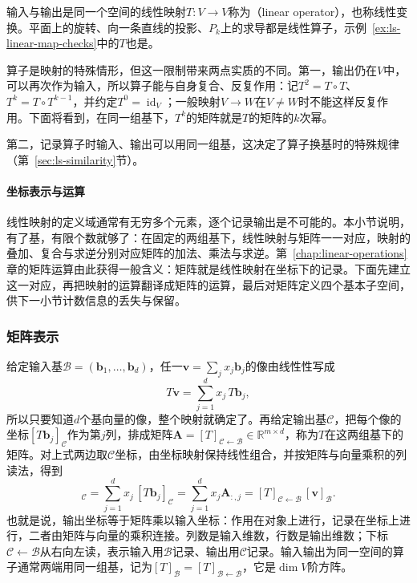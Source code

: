 \label{sec:ls-operator-powers}
输入与输出是同一个空间的线性映射$T:V\to V$称为（linear operator），也称线性变换。平面上的旋转、向一条直线的投影、$P_k$上的求导都是线性算子，示例~\ref{ex:ls-linear-map-checks}中的$T$也是。

算子是映射的特殊情形，但这一限制带来两点实质的不同。第一，输出仍在$V$中，可以再次作为输入，所以算子能与自身复合、反复作用：记$T^2=T\circ T$、$T^k=T\circ T^{k-1}$，并约定$T^0=\operatorname{id}_V$；一般映射$V\to W$在$V\neq W$时不能这样反复作用。下面将看到，在同一组基下，$T^k$的矩阵就是$T$的矩阵的$k$次幂。

第二，记录算子时输入、输出可以用同一组基，这决定了算子换基时的特殊规律（第~\ref{sec:ls-similarity}节）。

\paragraph{坐标表示与运算}
\label{sec:ls-map-representation}

线性映射的定义域通常有无穷多个元素，逐个记录输出是不可能的。本小节说明，有了基，有限个数就够了：在固定的两组基下，线性映射与矩阵一一对应，映射的叠加、复合与求逆分别对应矩阵的加法、乘法与求逆。第~\ref{chap:linear-operations}章的矩阵运算由此获得一般含义：矩阵就是线性映射在坐标下的记录。下面先建立这一对应，再把映射的运算翻译成矩阵的运算，最后对矩阵定义四个基本子空间，供下一小节计数信息的丢失与保留。

\subsubsection{矩阵表示}

给定输入基$\mathcal B=(\bm b_1,\ldots,\bm b_d)$，任一$\bm v=\sum_jx_j\bm b_j$的像由线性性写成
\[
 T\bm v=\sum_{j=1}^d x_j\,T\bm b_j,
\]
所以只要知道$d$个基向量的像，整个映射就确定了。再给定输出基$\mathcal C$，把每个像的坐标$[T\bm b_j]_{\mathcal C}$作为第$j$列，排成矩阵$\bm A=[T]_{\mathcal C\leftarrow\mathcal B}\in\mathbb R^{m\times d}$，称为$T$在这两组基下的矩阵。对上式两边取$\mathcal C$坐标，由坐标映射保持线性组合，并按矩阵与向量乘积的列读法，得到
\begin{equation}
 [T\bm v]_{\mathcal C}
 =\sum_{j=1}^d x_j\,[T\bm b_j]_{\mathcal C}
 =\sum_{j=1}^d x_j\bm A_{:,j}
 =[T]_{\mathcal C\leftarrow\mathcal B}\,[\bm v]_{\mathcal B}.
 \label{eq:linear-algebra-map-matrix-representation}
\end{equation}
也就是说，输出坐标等于矩阵乘以输入坐标：作用在对象上进行，记录在坐标上进行，二者由矩阵与向量的乘积连接。列数是输入维数，行数是输出维数；下标$\mathcal C\leftarrow\mathcal B$从右向左读，表示输入用$\mathcal B$记录、输出用$\mathcal C$记录。输入输出为同一空间的算子通常两端用同一组基，记为$[T]_{\mathcal B}=[T]_{\mathcal B\leftarrow\mathcal B}$，它是$\dim V$阶方阵。

